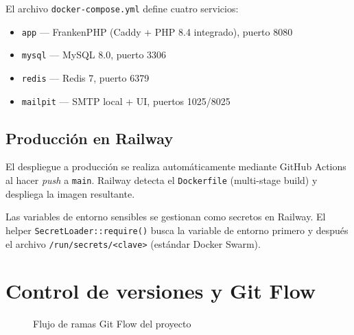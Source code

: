 \documentclass[12pt,a4paper,twoside,openright]{report}
\begin{document}
El archivo \texttt{docker-compose.yml} define cuatro servicios:
\begin{itemize}[nosep]
  \item \texttt{app} — FrankenPHP (Caddy + PHP 8.4 integrado), puerto 8080
  \item \texttt{mysql} — MySQL 8.0, puerto 3306
  \item \texttt{redis} — Redis 7, puerto 6379
  \item \texttt{mailpit} — SMTP local + UI, puertos 1025/8025
\end{itemize}

\subsection{Producción en Railway}

El despliegue a producción se realiza automáticamente mediante GitHub Actions al
hacer \textit{push} a \texttt{main}. Railway detecta el \texttt{Dockerfile}
(multi-stage build) y despliega la imagen resultante.

Las variables de entorno sensibles se gestionan como secretos en Railway. El helper
\texttt{SecretLoader::require()} busca la variable de entorno primero y después el
archivo \texttt{/run/secrets/<clave>} (estándar Docker Swarm).

\section{Control de versiones y Git Flow}
\label{sec:gitflow}

\begin{figure}[H]
  \centering
  \caption{Flujo de ramas Git Flow del proyecto}
  \label{fig:gitflow}
\end{figure}
\end{document}

